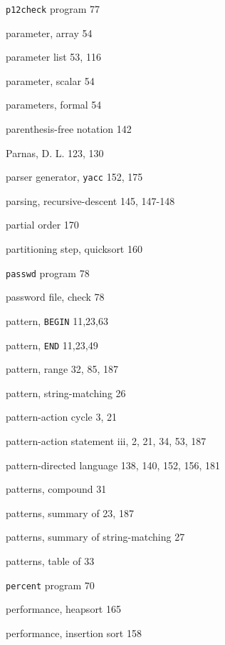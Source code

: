\begin{multicols}{3}
\hangindent=4pc  \verb'p12check' program 77

\hangindent=4pc  parameter, array 54

\hangindent=4pc  parameter list 53, 116

\hangindent=4pc  parameter, scalar 54

\hangindent=4pc  parameters, formal 54

\hangindent=4pc  parenthesis-free notation 142

\hangindent=4pc  Parnas, D. L. 123, 130

\hangindent=4pc  parser generator, \verb'yacc' 152, 175

\hangindent=4pc  parsing, recursive-descent 145, 147-148

\hangindent=4pc  partial order 170

\hangindent=4pc  partitioning step, quicksort 160

\hangindent=4pc  \verb'passwd' program 78

\hangindent=4pc  password file, check 78

\hangindent=4pc  pattern, \verb'BEGIN' 11,23,63

\hangindent=4pc  pattern, \verb'END' 11,23,49

\hangindent=4pc  pattern, range 32, 85, 187

\hangindent=4pc  pattern, string-matching 26

\hangindent=4pc  pattern-action cycle 3, 21

\hangindent=4pc  pattern-action statement iii, 2, 21, 34, 53, 187

\hangindent=4pc  pattern-directed language 138,  140, 152, 156, 181

\hangindent=4pc  patterns, compound 31

\hangindent=4pc  patterns, summary of 23, 187

\hangindent=4pc  patterns, summary of string-matching 27

\hangindent=4pc  patterns, table of 33

\hangindent=4pc  \verb'percent' program 70

\hangindent=4pc  performance, heapsort 165

\hangindent=4pc  performance, insertion sort 158


\end{multicols}
